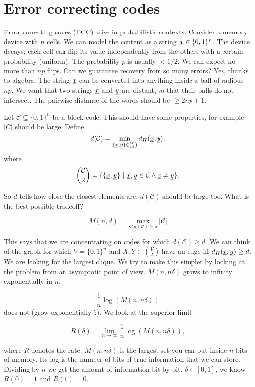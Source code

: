 
\chapter{Error correcting codes}
Error correcting codes (ECC) arise in probabilistic contexts. Consider a memory device with $n$ cells. We can model the content as a string $\underline{x} \in \{0, 1\}^n$. The device decays; each cell can flip its value independently from the others with a certain probability (uniform). The probability $p$ is usually $< 1/2$. We can expect no more than $np$ flips. Can we guarantee recovery from so many errors? Yes, thanks to algebra. The string $\underline{x}$ can be converted into anything inside a ball of radious $np$. We want that two strings $\underline{x}$ and $\underline{y}$ are distant, so that their balls do not intersect. The pairwise distance of the words should be $\geq 2np + 1$.

Let $\mathcal{C} \subseteq \{0, 1\}^n$ be a block code. This should have some properties, for example $|C|$ should be large. Define
\[
 d(\mathcal{C}) = \min_{\{\underline{x}, \underline{y}\}\in \binom{\mathcal{C}}{2}}d_H(\underline{x}, \underline{y}),
\]
where 
\[
\binom{\mathcal{C}}{2} = \{\{\str{x}, \str{y}\}\ |\ \str{x}, \str{y} \in \mathcal{C} \wedge \str{x} \not= \str{y}\}. 
\]

So $d$ tells how close the closest elements are. $d(\mathcal{C})$ should be large too. What is the best possible tradeoff?

\[
 M(n, d) = \max_{C | d(\mathcal{C}) \geq d}|\mathcal{C}|
\]

This says that we are concentrating on codes for which $d(\mathcal{C}) \geq d$. We can think of the graph for which $V = \{0, 1\}^n$ and $X, Y \in \binom{V}{2}$ have an edge iff $d_H(\underline{x}, \underline{y}) \geq d$. We are looking for the largest clique. We try to make this simpler by looking at the problem from an asymptotic point of view. $M(n, n\delta)$ grows to infinity exponentially in $n$.

\[
 \dfrac{1}{n}\log(M(n, n\delta))
\]
does not (grow exponentially ?). We look at the superior limit
 
\[
 R(\delta) = \overline{\lim_{n \rightarrow \infty}}  \dfrac{1}{n}\log(M(n, n\delta)),
\]

where $R$ denotes the rate. $M(n, n\delta)$ is the largest set you can put inside $n$ bits of memory. Its log is the number of bits of true information that we can store. Dividing by $n$ we get the amount of information bit by bit. $\delta \in [0, 1]$, we know $R(0) = 1$ and $R(1) = 0$.


